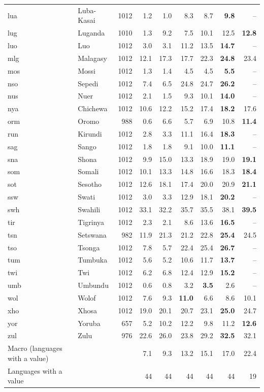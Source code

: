 {\begin{longtable}{@{}llrrrrrrr@{}}
lua & Luba-Kasai & 1012 & 1.2 & 1.0 & 8.3 & 8.7 & \textbf{9.8} & -- \\
lug & Luganda & 1010 & 1.3 & 9.2 & 7.5 & 10.1 & 12.5 & \textbf{12.8} \\
luo & Luo & 1012 & 3.0 & 3.1 & 11.2 & 13.5 & \textbf{14.7} & -- \\
mlg & Malagasy & 1012 & 12.1 & 17.3 & 17.7 & 22.3 & \textbf{24.8} & 23.4 \\
mos & Mossi & 1012 & 1.3 & 1.4 & 4.5 & 4.5 & \textbf{5.5} & -- \\
nso & Sepedi & 1012 & 7.4 & 6.5 & 24.8 & 24.7 & \textbf{26.2} & -- \\
nus & Nuer & 1012 & 2.1 & 1.5 & 9.3 & 10.1 & \textbf{14.0} & -- \\
nya & Chichewa & 1012 & 10.6 & 12.2 & 15.2 & 17.4 & \textbf{18.2} & 17.6 \\
orm & Oromo & 988 & 0.6 & 6.6 & 5.7 & 6.9 & 10.8 & \textbf{11.4} \\
run & Kirundi & 1012 & 2.8 & 3.3 & 11.1 & 16.4 & \textbf{18.3} & -- \\
sag & Sango & 1012 & 1.8 & 1.8 & 9.1 & 10.0 & \textbf{11.1} & -- \\
sna & Shona & 1012 & 9.9 & 15.0 & 13.3 & 18.9 & 19.0 & \textbf{19.1} \\
som & Somali & 1012 & 10.1 & 13.3 & 14.8 & 16.6 & 18.3 & \textbf{18.4} \\
sot & Sesotho & 1012 & 12.6 & 18.1 & 17.4 & 20.0 & 20.9 & \textbf{21.1} \\
ssw & Swati & 1012 & 3.0 & 3.3 & 12.9 & 18.1 & \textbf{20.2} & -- \\
swh & Swahili & 1012 & 33.1 & 32.2 & 35.7 & 35.5 & 38.1 & \textbf{39.5} \\
tir & Tigrinya & 1012 & 2.3 & 2.1 & 8.6 & 13.6 & \textbf{16.5} & -- \\
tsn & Setswana & 982 & 11.9 & 21.3 & 21.2 & 22.8 & \textbf{25.4} & 24.5 \\
tso & Tsonga & 1012 & 7.8 & 5.7 & 22.4 & 25.4 & \textbf{26.7} & -- \\
tum & Tumbuka & 1012 & 5.6 & 5.2 & 10.6 & 11.7 & \textbf{13.7} & -- \\
twi & Twi & 1012 & 6.2 & 6.8 & 12.4 & 12.9 & \textbf{15.2} & -- \\
umb & Umbundu & 1012 & 0.6 & 0.8 & 3.2 & \textbf{3.5} & 2.6 & -- \\
wol & Wolof & 1012 & 7.6 & 9.3 & \textbf{11.0} & 6.6 & 8.6 & 10.1 \\
xho & Xhosa & 1012 & 19.0 & 20.1 & 20.7 & 23.1 & \textbf{25.0} & 24.7 \\
yor & Yoruba & 657 & 5.2 & 10.2 & 12.2 & 9.8 & 11.2 & \textbf{12.6} \\
zul & Zulu & 976 & 22.6 & 26.0 & 23.8 & 29.2 & \textbf{32.5} & 32.1 \\
\midrule
Macro (languages with a value) & & & 7.1 & 9.3 & 13.2 & 15.1 & 17.0 & 22.4 \\
Languages with a value & & & 44 & 44 & 44 & 44 & 44 & 19 \\
\end{longtable}}

